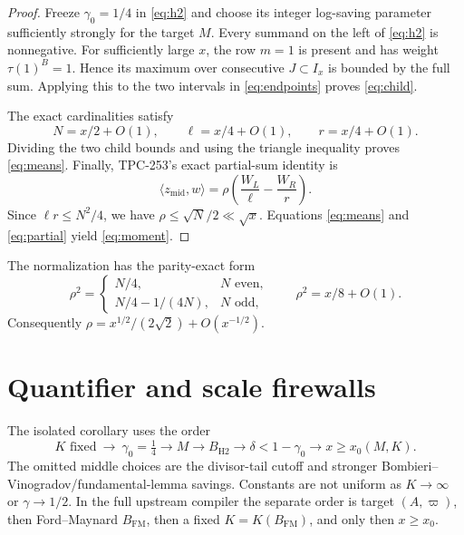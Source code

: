 \documentclass[10pt]{article}
\newcommand{\ip}[2]{\langle #1,#2\rangle}
\newcommand{\zm}{z_{\mathrm{mid}}}
\newcommand{\WL}{W_L}
\newcommand{\WR}{W_R}
\begin{document}
\begin{proof}
Freeze $\gamma_0=1/4$ in \eqref{eq:h2} and choose its integer log-saving
parameter sufficiently strongly for the target $M$.  Every summand on the
left of \eqref{eq:h2} is nonnegative.  For sufficiently large $x$, the row
$m=1$ is present and has weight $\tau(1)^B=1$.  Hence its maximum over
consecutive $J\subset I_x$ is bounded by the full sum.  Applying this to the
two intervals in \eqref{eq:endpoints} proves \eqref{eq:child}.

The exact cardinalities satisfy
\[
 N=x/2+O(1),\qquad \ell=x/4+O(1),\qquad r=x/4+O(1).
\]
Dividing the two child bounds and using the triangle inequality proves
\eqref{eq:means}.  Finally, TPC-253's exact partial-sum identity is
\begin{equation}
 \ip{\zm}w=\rho\left(\frac{\WL}{\ell}-\frac{\WR}{r}\right).         \label{eq:partial}
\end{equation}
Since $\ell r\leq N^2/4$, we have $\rho\leq\sqrt N/2\ll\sqrt x$.
Equations \eqref{eq:means} and \eqref{eq:partial} yield
\eqref{eq:moment}.
\end{proof}

The normalization has the parity-exact form
\begin{equation}
 \rho^2=\begin{cases}
 N/4,&N\text{ even},\\[2pt]
 N/4-1/(4N),&N\text{ odd},
 \end{cases}
 \qquad
 \rho^2=x/8+O(1).                                      \label{eq:rho}
\end{equation}
Consequently $\rho=x^{1/2}/(2\sqrt2)+O(x^{-1/2})$.

\section{Quantifier and scale firewalls}

The isolated corollary uses the order
\begin{equation}
 \boxed{K\text{ fixed}}\ \longrightarrow\ \gamma_0=\tfrac14
 \longrightarrow M\longrightarrow B_{\mathrm{H2}}
 \longrightarrow \delta<1-\gamma_0
 \longrightarrow x\geq x_0(M,K).                     \label{eq:quantifiers}
\end{equation}
The omitted middle choices are the divisor-tail cutoff and stronger
Bombieri--Vinogradov/fundamental-lemma savings.  Constants are not uniform as
$K\to\infty$ or $\gamma\to1/2$.  In the full upstream compiler the separate
order is target $(A,\varpi)$, then Ford--Maynard $B_{\mathrm{FM}}$, then a
fixed $K=K(B_{\mathrm{FM}})$, and only then $x\geq x_0$.
\end{document}
